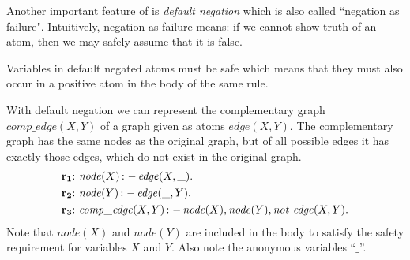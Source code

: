 \documentclass[a4paper, titlepage]{article}
\newcommand{\mi}[1]{\mathit{#1}}
\DeclareMathOperator{\leftimpl}{:-}
\DeclareMathOperator{\nott}{\mathit{not}}
\newcommand{\rowprefix}[1]{%
  \ensuremath{\color{black}\mathbf{#1{:}}\ }%
}
\begin{document}
Another important feature of \dlvhex{} is \emph{default 
negation} which is also called ``negation as failure". 
Intuitively, negation as failure means:
if we cannot show truth of an atom,
then we may safely assume that it is false.

Variables in default negated atoms must be safe
which means that they must also occur in a positive atom
in the body of the same rule.

\begin{exmp}
With default negation we can represent the 
complementary graph $\mi{comp\_edge}(X,Y)$
of a graph given as atoms $\mi{edge}(X,Y)$.
The complementary graph has the same nodes as the original graph,
but of all possible edges it has exactly those edges,
which do not exist in the original graph.
\begin{align*}
\rowprefix{r_1}& \mathit{node}(X) \leftimpl \mathit{edge}(X, \_).  \\
\rowprefix{r_2}& \mathit{node}(Y) \leftimpl \mathit{edge}(\_, Y).  \\
\rowprefix{r_3}& \mathit{comp\_edge}(X, Y) \leftimpl 
  \mathit{node}(X), \mathit{node}(Y),
  \nott \thinspace \mathit{ edge }(X, Y). 
\end{align*}
Note that $\mathit{node}(X)$ and $\mathit{node}(Y)$ 
are included in the body to satisfy the 
safety requirement for variables $X$ and $Y$.
Also note the anonymous variables \enquote{$\_$}.
\end{exmp}
\end{document}
